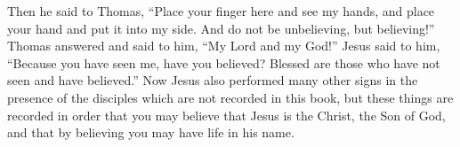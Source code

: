 \begin{biblechapter}
\verse Then he said to Thomas, “Place your finger here and see my hands, and place your hand and put it into my side. And do not be unbelieving, but believing!”
\verse Thomas answered and said to him, “My Lord and my God!”
\verse Jesus said to him, “Because you have seen me, have you believed? Blessed are those who have not seen and have believed.”
 Now Jesus also performed many other signs in the presence of the disciples which are not recorded in this book,
\verse but these things are recorded in order that you may believe that Jesus is the Christ, the Son of God, and that by believing you may have life in his name.
\end{biblechapter}

